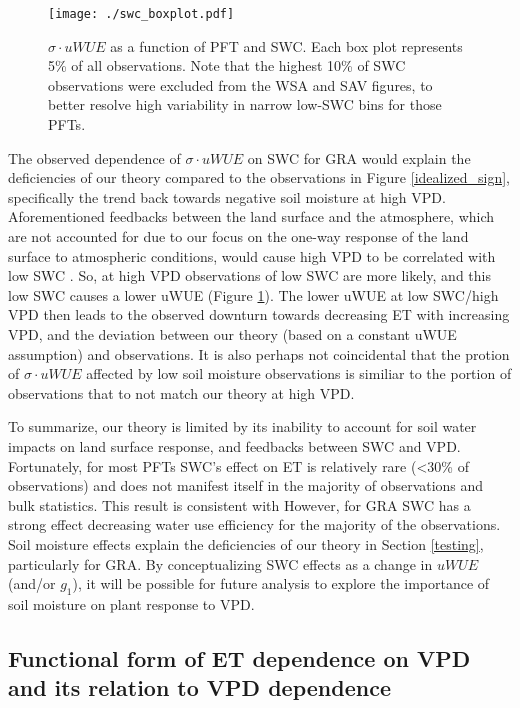 \documentclass[draft,linenumbers]{agujournal}
\begin{document}
\begin{figure}
  \centering
  \centerline{\texttt{[image: ./swc\_boxplot.pdf]}}
  \caption{$\sigma \cdot uWUE$ as a function of PFT and SWC. Each box
    plot represents 5\% of all observations. Note that the highest
    10\% of SWC observations were excluded from the WSA and SAV
    figures, to better resolve high variability in narrow low-SWC bins
    for those PFTs.}
  \label{swc_boxplot}
\end{figure}

The observed dependence of $\sigma \cdot uWUE$ on SWC for GRA would
explain the deficiencies of our theory compared to the observations in
Figure \ref{idealized_sign}, specifically the trend back towards
negative soil moisture at high VPD. Aforementioned feedbacks between
the land surface and the atmosphere, which are not accounted for due
to our focus on the one-way response of the land surface to
atmospheric conditions, would cause high VPD to be correlated with low
SWC \citep[][]{Gentine_2016, Berg_2016}. So, at high VPD observations
of low SWC are more likely, and this low SWC causes a lower uWUE
(Figure \ref{swc_boxplot}). The lower uWUE at low SWC/high VPD then
leads to the observed downturn towards decreasing ET with increasing
VPD, and the deviation between our theory (based on a constant uWUE
assumption) and observations. It is also perhaps not coincidental that
the protion of $\sigma \cdot uWUE$ affected by low soil moisture
observations is similiar to the portion of observations that to not
match our theory at high VPD.

To summarize, our theory is limited by its inability to account for
soil water impacts on land surface response, and feedbacks between SWC
and VPD. Fortunately, for most PFTs SWC's effect on ET is relatively
rare (<30\% of observations) and does not manifest itself in the
majority of observations and bulk statistics. This result is
consistent with However, for GRA SWC has
a strong effect decreasing water use efficiency for the majority of
the observations. Soil moisture effects explain the deficiencies of
our theory in Section \ref{testing}, particularly for GRA. By
conceptualizing SWC effects as a change in $uWUE$ (and/or $g_1$), it
will be possible for future analysis to explore the importance of soil
moisture on plant response to VPD.

\subsection{Functional form of ET dependence on VPD and its relation
  to VPD dependence}
\label{functional_form}
\end{document}

